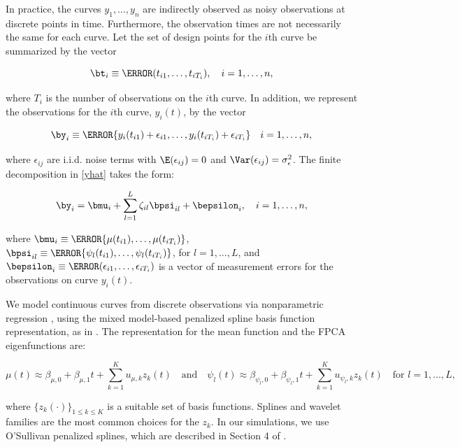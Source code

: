 \documentclass[12pt]{article}
\def\sigsqeps{\sigma^2_{\epsilon}}
\theoremstyle{plain}
\theoremstyle{definition}
\theoremstyle{remark}
\begin{document}
In practice, the curves $y_1, \dots, y_n$ are indirectly observed as noisy observations at discrete points in time.
Furthermore, the observation times are not necessarily the same for each curve.
Let the set of design points for the $i$th curve be summarized by the vector

\begin{equation}
	\bt_i \equiv \T{(t_{i1}, \dots, t_{iT_i})}, \quad i = 1, \dots, n,
\label{t_i}
\end{equation}

\noindent where $T_i$ is the number of observations on the $i$th curve. In addition, we represent the
observations for the $i$th curve, $y_i (t)$, by the vector

\begin{equation}
	\by_i \equiv \T{\{ y_i (t_{i1}) + \epsilon_{i1}, \dots, y_i (t_{iT_i}) + \epsilon_{iT_i} \}} \quad i = 1, \dots, n,
\label{disc_obs}
\end{equation}

\noindent where $\epsilon_{ij}$ are i.i.d. noise terms with $\E (\epsilon_{ij}) = 0$ and $\Var (\epsilon_{ij}) = \sigsqeps$.
The finite decomposition in \eqref{yhat} takes the form:

\begin{equation}
	\by_i = \bmu_i + \sum_{l=1}^L \zeta_{il} \bpsi_{il} + \bepsilon_{i}, \quad i = 1, \dots, n,
\label{resp_mod}
\end{equation}

\noindent where $\bmu_i \equiv \T{\{ \mu (t_{i1}), \dots, \mu (t_{iT_i}) \}}$,
$\bpsi_{il} \equiv \T{\{ \psi_l (t_{i1}), \dots, \psi_l (t_{iT_i}) \}}$, for $l = 1, \dots, L$, and
$\bepsilon_{i} \equiv \T{(\epsilon_{i1}, \dots, \epsilon_{iT_i})}$ is a vector of measurement errors
for the observations on curve $y_i (t)$.

We model continuous curves from discrete observations via nonparametric regression \cite{ruppert03, ruppert09},
using the mixed model-based penalized spline basis function representation, as in . The
representation for the mean function and the FPCA eigenfunctions are:

\[
	\mu (t) \approx \beta_{\mu, 0} + \beta_{\mu, 1} t + \sum_{k=1}^K u_{\mu, k} z_k (t) \quad
	\text{and} \quad
	\psi_l (t) \approx \beta_{\psi_l, 0} + \beta_{\psi_l, 1} t + \sum_{k=1}^K u_{\psi_l, k} z_k (t) \quad
	\text{for $l = 1, \dots, L$},
\]

\noindent where $\{ z_k (\cdot) \}_{1 \le k \le K}$ is a suitable set of
basis functions. Splines and wavelet families are the most common choices for the $z_k$. In our simulations, we
use O'Sullivan penalized splines, which are described in Section 4 of .
\end{document}

